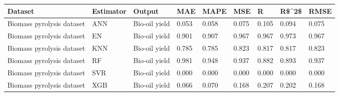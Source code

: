 \begin{tabular}{lllllllll}
\toprule
                  Dataset &  Estimator &        Output &   MAE &  MAPE &   MSE &     R & R\$\textasciicircum 2\$ &  RMSE \\
\midrule
Biomass pyrolysis dataset &        ANN & Bio-oil yield & 0.053 & 0.058 & 0.075 & 0.105 & 0.094 & 0.075 \\
Biomass pyrolysis dataset &         EN & Bio-oil yield & 0.901 & 0.907 & 0.967 & 0.967 & 0.973 & 0.967 \\
Biomass pyrolysis dataset &        KNN & Bio-oil yield & 0.785 & 0.785 & 0.823 & 0.817 & 0.817 & 0.823 \\
Biomass pyrolysis dataset &         RF & Bio-oil yield & 0.981 & 0.948 & 0.937 & 0.882 & 0.893 & 0.937 \\
Biomass pyrolysis dataset &        SVR & Bio-oil yield & 0.000 & 0.000 & 0.000 & 0.000 & 0.000 & 0.000 \\
Biomass pyrolysis dataset &        XGB & Bio-oil yield & 0.066 & 0.070 & 0.168 & 0.207 & 0.202 & 0.168 \\
\bottomrule
\end{tabular}
